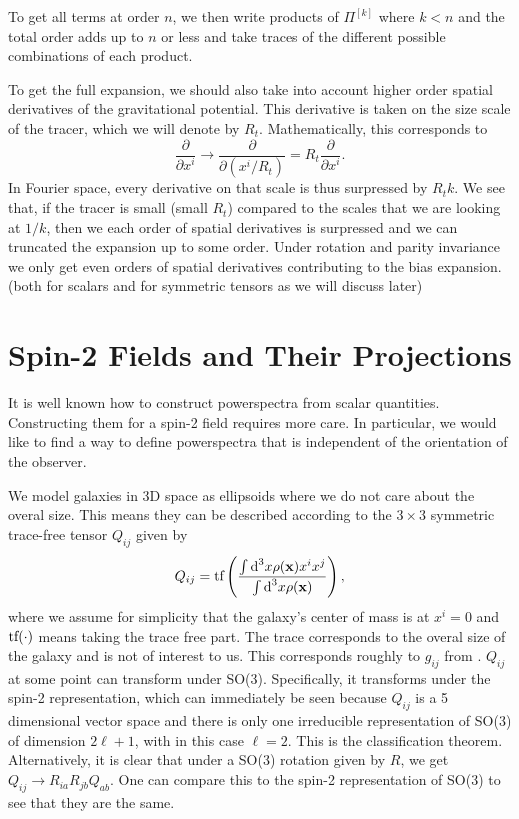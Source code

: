 \documentclass[11pt]{article}
\DeclareRobustCommand{\d}{\ifmmode\text{d}\else d\fi}
\DeclareRobustCommand{\tf}{\ifmmode\text{tf}\else d\fi}
\newcommand{\br}[1]{\ensuremath{\left( #1 \right)}}
\begin{document}
To get all terms at order $n$, we then write products of $\Pi^{[k]}$ where $k<n$ and the total order adds up to $n$ or less and take traces of the different possible combinations of each product. %

To get the full expansion, we should also take into account higher order spatial derivatives of the gravitational potential. This derivative is taken on the size scale of the tracer, which we will denote by $R_t$. Mathematically, this corresponds to
\begin{equation}
    \frac{\partial}{\partial x^i} \rightarrow \frac{\partial}{\partial \br{x^i/R_t}}=R_t\frac{\partial}{\partial x^i}.
\end{equation}
In Fourier space, every derivative on that scale is thus surpressed by $R_t k$. We see that, if the tracer is small (small $R_t$) compared to the scales that we are looking at $1/k$, then we each order of spatial derivatives is surpressed and we can truncated the expansion up to some order. Under rotation and parity invariance we only get even orders of spatial derivatives contributing to the bias expansion. (both for scalars and for symmetric tensors as we will discuss later)

\section{Spin-2 Fields and Their Projections}
It is well known how to construct powerspectra from scalar quantities. Constructing them for a spin-2 field requires more care. In particular, we would like to find a way to define powerspectra that is independent of the orientation of the observer.

We model galaxies in 3D space as ellipsoids where we do not care about the overal size. This means they can be described according to the $3 \times 3$ symmetric trace-free tensor $Q_{ij}$ given by
\begin{equation}
    Q_{ij} = \tf\br{\frac{\int \d^3 x \rho(\mathbf x) x^i x^j}{\int\d^3 x \rho(\mathbf x)}},
\end{equation}
where we assume for simplicity that the galaxy's center of mass is at $x^i=0$ and $\tf (\cdot)$ means taking the trace free part. The trace corresponds to the overal size of the galaxy and is not of interest to us. This corresponds roughly to $g_{ij}$ from \cite{bakx2023effectivefieldtheoryintrinsic}.
$Q_{ij}$ at some point can transform under SO(3). Specifically, it transforms under the spin-2 representation, which can immediately be seen because $Q_{ij}$ is a 5 dimensional vector space and there is only one irreducible representation of SO(3) of dimension $2\ell + 1$, with in this case $\ell = 2$. This is the classification theorem. %
Alternatively, it is clear that under a SO(3) rotation given by $R$, we get $Q_{ij} \rightarrow R_{ia}R_{jb}Q_{ab}$. One can compare this to the spin-2 representation of SO(3) to see that they are the same. %
\end{document}
